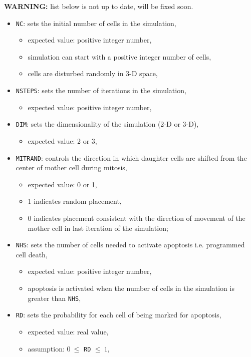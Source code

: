 \documentclass[10pt]{article}
\begin{document}
{\bf WARNING:} list below is not up to date, will be fixed soon.

\begin{itemize}
\item {\tt NC}: sets the initial number of cells in the simulation,
\begin{itemize}
\item expected value: positive integer number,
\item simulation can start with a positive integer number of cells, 
\item cells are disturbed randomly in 3-D space, 
\end{itemize}

\item {\tt NSTEPS}: sets the number of iterations in the simulation,
\begin{itemize}
\item expected value: positive integer number,
\end{itemize}

\item {\tt DIM}: sets the dimensionality of the simulation (2-D or 3-D),
\begin{itemize}
\item expected value: 2 or 3,
\end{itemize}

\item {\tt MITRAND}: controls the direction in which daughter cells are shifted from the center of mother cell during mitosis,
\begin{itemize}
\item expected value: 0 or 1,
\item 1 indicates random placement, 
\item 0 indicates placement consistent with the direction of movement of the mother cell in last iteration of the simulation; 
\end{itemize}

\item {\tt NHS}: sets the number of cells needed to activate apoptosis i.e. programmed cell death,
\begin{itemize}
\item expected value: positive integer number,
\item apoptosis is activated when the number of cells in the simulation is greater than {\tt NHS},
\end{itemize}

\item {\tt RD}: sets the probability for each cell of being marked for apoptosis,
\begin{itemize}
\item expected value: real value,
\item assumption: $0\ \le$ {\tt RD} $\le\ 1$,
\end{itemize}


\end{itemize}
\end{document}
